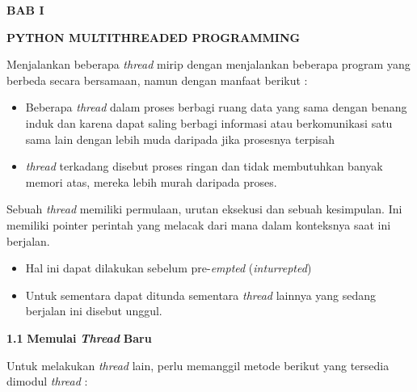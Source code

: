 \begin{center}{\fontsize{14pt}{14pt}\selectfont \textbf{BAB I} \\}\end{center} \par
\noindent 
\begin{center}{\fontsize{14pt}{14pt}\selectfont \textbf{PYTHON MULTITHREADED PROGRAMMING} \\}\end{center} \par
\vspace{14pt}
\vspace{14pt}
Menjalankan beberapa\textit{ thread} mirip dengan menjalankan beberapa program yang berbeda secara bersamaan, namun dengan manfaat berikut : \par
\begin{itemize}
	\item Beberapa \textit{thread} dalam proses berbagi ruang data yang sama dengan benang induk dan karena dapat saling berbagi informasi atau berkomunikasi satu sama lain dengan lebih muda daripada jika prosesnya terpisah \par
	\item \textit{thread} terkadang disebut proses ringan dan tidak membutuhkan banyak memori atas, mereka lebih murah daripada proses.\end{itemize}
\par
Sebuah \textit{thread} memiliki permulaan, urutan eksekusi dan sebuah kesimpulan. Ini memiliki pointer perintah yang melacak dari mana dalam konteksnya saat ini berjalan. \par
\begin{itemize}
	\item Hal ini dapat dilakukan sebelum pre-\textit{empted} (\textit{inturrepted})\end{itemize}
\par
\noindent 
\begin{itemize}
	\item Untuk sementara dapat ditunda sementara \textit{thread} lainnya yang sedang berjalan ini disebut unggul. \end{itemize}
\par
\noindent 
\textbf{1.}\textbf{1 }\textbf{Memulai }\textbf{\textit{Thread}}\textbf{ Baru} \par
\noindent 
\hspace*{0.5in} Untuk melakukan \textit{thread} lain, perlu memanggil metode berikut yang tersedia dimodul \textit{thread} : \par

